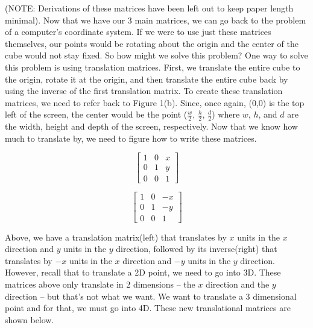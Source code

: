 \documentclass[14pt]{article}
\begin{document}
(NOTE: Derivations of these 	matrices have been left out to keep paper length minimal). Now that we have our 3 main matrices, we can go back to the problem of a computer's coordinate system. If we were to use just these matrices themselves, our points would be rotating about the origin and the center of the cube would not stay fixed. So how might we solve this problem? One way to solve this problem is using translation matrices. First, we translate the entire cube to the origin, rotate it at the origin, and then translate the entire cube back by using the inverse of the first translation matrix. To create these translation matrices, we need to refer back to Figure 1(b). Since, once again, (0,0) is the top left of the screen, the center would be the point ($\frac{w}{2}$, $\frac{h}{2}$, $\frac{d}{2}$) where $w$, $h$, and $d$ are the width, height and depth of the screen, respectively. Now that we know how much to translate by, we need to figure how to write these matrices.

\begin{figure}[H]
	\begin{center}
		\begin{minipage}[b]{0.45\textwidth}
			\centering
			
			$$
			\begin{bmatrix}
			1 & 0 & x \\
			0 & 1 & y \\ 
			0 & 0 & 1
			\end{bmatrix}
			$$
		\end{minipage}
		\hfill
		\begin{minipage}[b]{0.45\textwidth}
			\centering
			$$
			\begin{bmatrix}
			1 & 0 & -x \\
			0 & 1 & -y \\ 
			0 & 0 & 1
			\end{bmatrix}			
			$$
		\end{minipage}
	\end{center}
\end{figure}

Above, we have a translation matrix(left) that translates by $x$ units in the $x$ direction and $y$ units in the $y$ direction, followed by its inverse(right) that translates by $-x$ units in the $x$ direction and $-y$ units in the $y$ direction. However, recall that to translate a 2D point, we need to go into 3D. These matrices above only translate in 2 dimensions -- the $x$ direction and the $y$ direction -- but that's not what we want. We want to translate a 3 dimensional point and for that, we must go into 4D. These new translational matrices are shown below.
\end{document}
